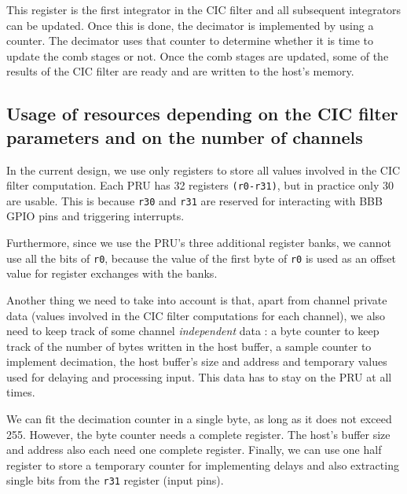 \documentclass[]{report}
\begin{document}
This register is the first integrator in the CIC filter and all subsequent integrators can be updated. Once this is done, the decimator is implemented by using a counter. The decimator uses that counter to determine whether it is time to update the comb stages or not. Once the comb stages are updated, some of the results of the CIC filter are ready and are written to the host's memory.

\hypertarget{usage-of-resources-depending-on-the-cic-filter-parameters-n-m-r-and-on-the-number-of-channels-c}{%
\subsection{\texorpdfstring{Usage of resources depending on the CIC
filter parameters and on the number of channels}{Usage of resources depending on the CIC filter parameters N, M, R and on the number of channels C}}\label{usage-of-resources-depending-on-the-cic-filter-parameters-n-m-r-and-on-the-number-of-channels-c}}

In the current design, we use only registers to store all values involved in the CIC filter computation. Each PRU has 32 registers \texttt{(r0-r31)}, but in practice only 30 are usable. This is because \texttt{r30} and \texttt{r31} are reserved for interacting with BBB GPIO pins and triggering interrupts.

Furthermore, since we use the PRU's three additional register banks, we cannot use all the bits of \texttt{r0}, because the value of the first byte of \texttt{r0} is used as an offset value for register exchanges with the banks.

Another thing we need to take into account is that, apart from channel private data (values involved in the CIC filter computations for each channel), we also need to keep track of some channel \textit{independent} data : a byte counter to keep track of the number of bytes written in the host buffer, a sample counter to implement decimation, the host buffer's size and address and temporary values used for delaying and processing input. This data has to stay on the PRU at all times.

We can fit the decimation counter in a single byte, as long as it does not exceed 255. However, the byte counter needs a complete register. The host's buffer size and address also each need one complete register. Finally, we can use one half register to store a temporary counter for implementing delays and also extracting single bits from the \texttt{r31} register (input pins).
\end{document}
